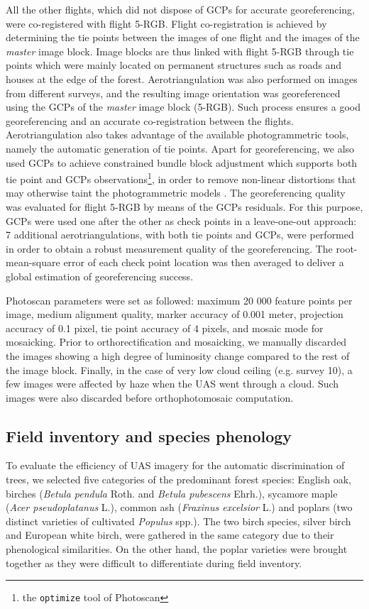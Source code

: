 \documentclass[remotesensing,article,submit,moreauthors,pdftex,12pt,a4paper]{mdpi} %
\begin{document}
All the other flights, which did not dispose of GCPs for accurate georeferencing, were co-registered with flight 5-RGB. 
Flight co-registration is achieved by determining the tie points between the images of one flight and the images of the {\it master} image block. 
Image blocks are thus linked with flight 5-RGB through tie points which were mainly located on permanent structures such as roads and houses at the edge of the forest. 
Aerotriangulation was also performed on images from different surveys, and the resulting image orientation was georeferenced using the GCPs of the {\it master} image block (5-RGB). 
Such process ensures a good georeferencing and an accurate co-registration between the flights. 
Aerotriangulation also takes advantage of the available photogrammetric tools, namely the automatic generation of tie points. 
Apart for georeferencing, we also used GCPs to achieve constrained bundle block adjustment which supports both tie point and GCPs observations\footnote{the \texttt{optimize} tool of Photoscan}, in order to remove non-linear distortions that may otherwise taint the photogrammetric models \citep{wu_critical_2014}. 
The georeferencing quality was evaluated for flight 5-RGB by means of the GCPs residuals. 
For this purpose, GCPs were used one after the other as check points in a leave-one-out approach: 7 additional aerotriangulations, with both tie points and GCPs, were performed in order to obtain a robust measurement quality of the georeferencing. 
The root-mean-square error of each check point location was then averaged to deliver a global estimation of georeferencing success.

Photoscan parameters were set as followed: maximum 20 000 feature points per image, medium alignment quality, marker accuracy of 0.001 meter, projection accuracy of 0.1 pixel, tie point accuracy of 4 pixels, and mosaic mode for mosaicking. 
Prior to orthorectification and mosaicking, we manually discarded the images showing a high degree of luminosity change compared to the rest of the image block. 
Finally, in the case of very low cloud ceiling (e.g. survey 10), a few images were affected by haze when the UAS went through a cloud. 
Such images were also discarded before orthophotomosaic computation.

\subsection{Field inventory and species phenology}

To evaluate the efficiency of UAS imagery for the automatic discrimination of trees, we selected five categories of the predominant forest species: English oak, birches (\textit{Betula pendula} Roth. and \textit{Betula pubescens} Ehrh.), sycamore maple (\textit{Acer pseudoplatanus} L.), common ash (\textit{Fraxinus excelsior} L.) and poplars (two distinct varieties of cultivated \textit{Populus} spp.). 
The two birch species, silver birch and European white birch, were gathered in the same category due to their phenological similarities. 
On the other hand, the poplar varieties were brought together as they were difficult to differentiate during field inventory. 
\end{document}

